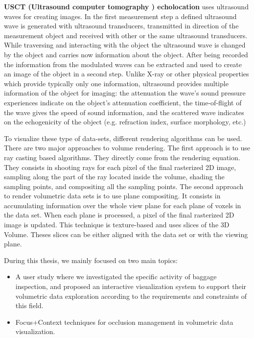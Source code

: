 \textbf{ USCT (Ultrasound computer tomography ) echolocation }  uses ultrasound waves for creating images. In the first measurement step a defined ultrasound wave is generated with  ultrasound transducers, transmitted in direction of the measurement object and received with other or the same ultrasound transducers. While traversing and interacting with the object the ultrasound wave is changed by the object and carries now information about the object. After being recorded the information from the modulated waves can be extracted and used to create an image of the object in a second step. Unlike X-ray or other physical properties which provide typically only one information, ultrasound provides multiple information of the object for imaging: the attenuation the wave's sound pressure experiences indicate on the object's attenuation coefficient, the time-of-flight of the wave gives the speed of sound information, and the scattered wave indicates on the echogenicity of the object (e.g. refraction index, surface morphology, etc.)


To visualize these type of data-sets, different rendering algorithms can be used. There are two major approaches to volume rendering. The first approach is to use ray casting based algorithms. They directly come from the rendering equation. They consists in shooting rays for each pixel of the final rasterized 2D image, sampling along the part of the ray located inside the volume, shading the sampling points, and compositing all the sampling points.   
The second approach to render volumetric data sets is to use plane compositing. It consists in accumulating information over the whole view plane for each plane of voxels in the data set. When each plane is processed, a pixel of the final rasterized 2D image is updated. This technique is texture-based and uses slices of the 3D Volume. Theses slices can be either aligned with the data set or with the viewing plane.

During this thesis, we mainly focused on two main topics: 

\begin{itemize}

\item A user study where we investigated the specific activity of baggage inspection, and proposed an interactive visualization system to support their volumetric data exploration according to the requirements and constraints of this field. 

\item Focus+Context techniques for occlusion management in volumetric data visualization.

\end{itemize}


